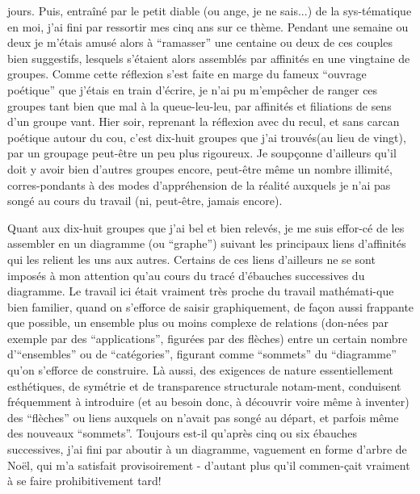 jours. Puis, entraîné par le petit diable (ou ange, je ne sais...) de la sys-\linebreak tématique en moi, j'ai fini par ressortir mes  cinq ans sur ce thème. Pendant une semaine ou deux je m'étais amusé alors à ``ramasser'' une centaine ou deux de ces couples bien suggestifs, lesquels s'étaient alors assemblés par affinités en une vingtaine de groupes. Comme cette réflexion s'est faite en marge du fameux ``ouvrage poétique'' que j'étais en train d'écrire, je n'ai pu m'empêcher de ranger ces groupes tant bien que mal à la queue-leu-leu, par affinités et filiations de sens d'un groupe \linebreak vant. Hier soir, reprenant la réflexion avec du recul, et sans carcan poétique autour du cou, c'est dix-huit groupes que j'ai trouvés(au lieu de vingt), par un groupage peut-être un peu plus rigoureux. Je soupçonne d'ailleurs qu'il doit y avoir bien d'autres groupes encore, peut-être même un nombre illimité, corres-\linebreak pondants à des modes d'appréhension de la réalité auxquels je n'ai pas songé au cours du travail (ni, peut-être, jamais encore).

Quant aux dix-huit groupes que j'ai bel et bien relevés, je me suis effor-\linebreak cé de les assembler en un diagramme (ou ``graphe'') suivant les principaux liens d'affinités qui les relient les uns aux autres. Certains de ces liens d'ailleurs ne se sont imposés à mon attention qu'au cours du tracé d'ébauches successives du diagramme. Le travail ici était vraiment très proche du travail mathémati-\linebreak que bien familier, quand on s'efforce de saisir graphiquement, de façon aussi frappante que possible, un ensemble plus ou moins complexe de relations (don-\linebreak nées par exemple par des ``applications'', figurées par des flèches) entre un certain nombre d'``ensembles'' ou de ``catégories'', figurant comme ``sommets'' du ``diagramme'' qu'on s'efforce de construire. Là aussi, des exigences de nature essentiellement esthétiques, de symétrie et de transparence structurale notam-\linebreak ment, conduisent fréquemment à introduire (et au besoin donc, à découvrir voire même à inventer) des ``flèches'' ou liens auxquels on n'avait pas songé au départ, et parfois même des nouveaux ``sommets''. Toujours est-il qu'après cinq ou six ébauches successives, j'ai fini par aboutir à un diagramme, vaguement en forme d'arbre de Noël, qui m'a satisfait provisoirement - d'autant plus qu'il commen-\inserted{\unsure{:}}\linebreak çait vraiment à se faire prohibitivement tard!


